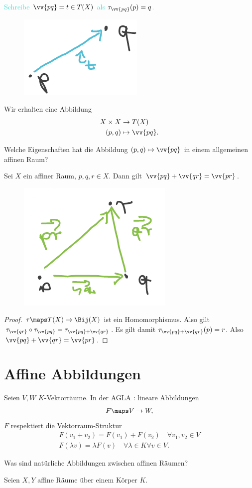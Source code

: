 \textcolor{Turquoise}{Schreibe \( \vv{pq}=t\in T(X) \) als \( \tau_{\vv{pq}}(p)=q \).}
\begin{figure}[H]
    \centering
    \includegraphics[width=0.2\linewidth]{figures/vektornotation}
    \label{fig:vektornotation}
\end{figure}
Wir erhalten eine Abbildung
\begin{align*}
    X\times X&\to T(X)\\
    (p,q)&\mapsto \vv{pq}.
\end{align*}
\begin{frage*}
    Welche Eigenschaften hat die Abbildung \( (p,q)\mapsto \vv{pq} \) in einem allgemeinen affinen Raum?
\end{frage*}
\begin{lemma}\label{vektoren_funzen_richtig}
    Sei \( X \) ein affiner Raum, \( p,q,r\in X \). Dann gilt \( \vv{pq}+\vv{qr}=\vv{pr} \).
\end{lemma}
\begin{figure}[H]
    \centering
    \includegraphics[width=0.3\linewidth]{figures/vektoren_funzen_richtig}
    \label{fig:vektoren_funzen_richtig}
\end{figure}
\begin{proof}
    \( \tau\maps T(X)\to \Bij(X) \) ist ein Homomorphismus. 
    Also gilt \( \tau_{\vv{qr}}\circ \tau_{\vv{pq}}=\tau_{\vv{pq}+\vv{qr}} \). 
    Es gilt damit \( \tau_{\vv{pq}+\vv{qr}}(p)=r \). 
    Also \( \vv{pq}+\vv{qr}=\vv{pr} \).    
\end{proof}

\section{Affine Abbildungen}
Seien \( V,W \) \( K \)-Vektorräume.
In der AGLA : lineare Abbildungen
\begin{align*}
    F\maps V\to W,
\end{align*}
\dh \( F \) respektiert die Vektorraum-Struktur
\begin{align*}
    F(v_1+v_2)=F(v_1)+F(v_2)\quad\forall v_1,v_2\in V\\
    F(\lambda v)=\lambda F(v)\quad \forall\lambda\in K \forall v \in V.
\end{align*}
\begin{frage*}
    Was sind natürliche Abbildungen zwischen affinen Räumen?
\end{frage*}
Seien \( X, Y \) affine Räume über einem Körper \( K \).

